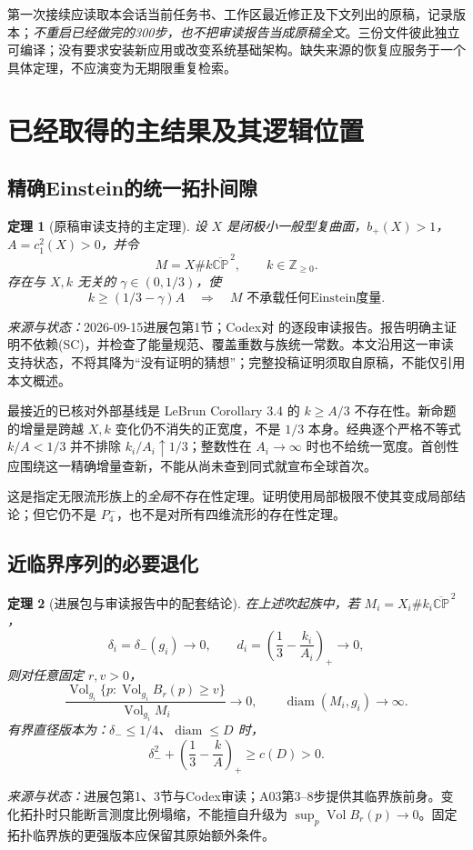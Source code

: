 \documentclass[UTF8,a4paper,11pt,fontset=fandol]{ctexart}
\numberwithin{equation}{section}
\newtheorem{theorem}{定理}[section]
\theoremstyle{definition}
\newcommand{\Vol}{\operatorname{Vol}}
\newcommand{\diam}{\operatorname{diam}}
\newcommand{\CP}{\mathbb{CP}}
\newcommand{\Z}{\mathbb Z}
\newcommand{\source}[1]{\par\noindent\textit{来源与状态：}#1\par}
\begin{document}
第一次接续应读取本会话当前任务书、工作区最近修正及下文列出的原稿，记录版本；\emph{不重启已经做完的300步，也不把审读报告当成原稿全文}。三份文件彼此独立可编译；没有要求安装新应用或改变系统基础架构。缺失来源的恢复应服务于一个具体定理，不应演变为无期限重复检索。

\section{已经取得的主结果及其逻辑位置}
\subsection{精确Einstein的统一拓扑间隙}
\begin{theorem}[原稿审读支持的主定理]\label{thm:topgap}
设 $X$ 是闭极小一般型复曲面，$b_+(X)>1$，$A=c_1^2(X)>0$，并令
\[
M=X\#k\overline{\CP}^{\,2},\qquad k\in\Z_{\ge0}.
\]
存在与 $X,k$ 无关的 $\gamma\in(0,1/3)$，使
\begin{equation}\label{eq:topgap}
 k\ge(1/3-\gamma)A\quad\Longrightarrow\quad
 M\text{ 不承载任何Einstein度量}.
\end{equation}
\end{theorem}
\source{2026-09-15进展包第1节；Codex对  的逐段审读报告\cite{Project,CodexReview}。报告明确主证明不依赖(SC)，并检查了能量规范、覆盖重数与族统一常数。本文沿用这一审读支持状态，不将其降为“没有证明的猜想”；完整投稿证明须取自原稿，不能仅引用本文概述。}

最接近的已核对外部基线是 LeBrun Corollary 3.4 的 $k\ge A/3$ 不存在性\cite{LeBrun2001}。新命题的增量是跨越 $X,k$ 变化仍不消失的正宽度，不是 $1/3$ 本身。经典逐个严格不等式 $k/A<1/3$ 并不排除 $k_i/A_i\uparrow1/3$；整数性在 $A_i\to\infty$ 时也不给统一宽度。首创性应围绕这一精确增量查新，不能从尚未查到同式就宣布全球首次。

这是指定无限流形族上的\emph{全局}不存在性定理。证明使用局部极限不使其变成局部结论；但它仍不是 $P_4^-$，也不是对所有四维流形的存在性定理。

\subsection{近临界序列的必要退化}
\begin{theorem}[进展包与审读报告中的配套结论]\label{thm:collapse}
在上述吹起族中，若 $M_i=X_i\#k_i\overline{\CP}^{\,2}$，
\[
\delta_i=\delta_-(g_i)\longrightarrow0,
\qquad d_i=\left(\frac13-\frac{k_i}{A_i}\right)_+\longrightarrow0,
\]
则对任意固定 $r,v>0$，
\begin{equation}\label{eq:measurecollapse}
\frac{\Vol_{g_i}\{p:\Vol_{g_i}B_r(p)\ge v\}}
{\Vol_{g_i}M_i}\longrightarrow0,
\qquad \diam(M_i,g_i)\longrightarrow\infty.
\end{equation}
有界直径版本为：$\delta_-\le1/4$、$\diam\le D$ 时，
\begin{equation}\label{eq:diambound}
\delta_-^2+\left(\frac13-\frac{k}{A}\right)_+\ge c(D)>0.
\end{equation}
\end{theorem}
\source{进展包第1、3节与Codex审读；A03第3--8步提供其临界族前身。变化拓扑时只能断言测度比例塌缩，不能擅自升级为 $\sup_p\Vol B_r(p)\to0$。固定拓扑临界族的更强版本应保留其原始额外条件。}
\end{document}
